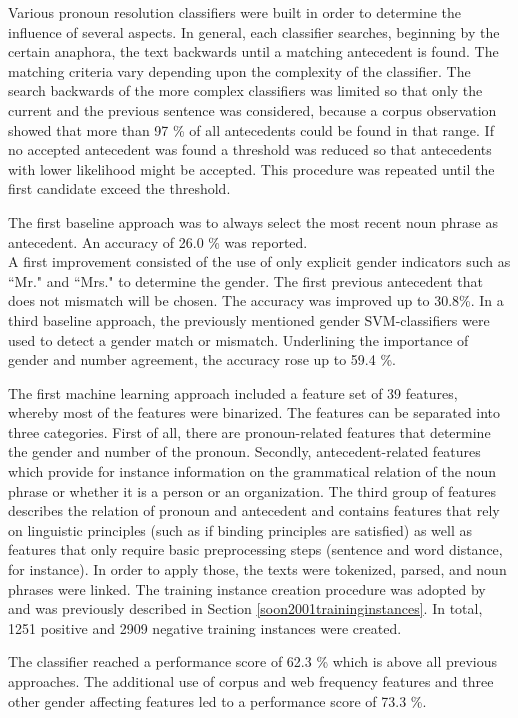 Various pronoun resolution classifiers were built in order to determine the influence of several aspects. In general, each classifier searches, beginning by the certain anaphora, the text backwards until a matching antecedent is found. The matching criteria vary depending upon the complexity of the classifier. The search backwards of the more complex classifiers was limited so that only the current and the previous sentence was considered, because a corpus observation showed that more than 97 \% of all antecedents could be found in that range. If no accepted antecedent was found a threshold was reduced so that antecedents with lower likelihood might be accepted. This procedure was repeated until the first candidate exceed the threshold. 

The first baseline approach was to always select the most recent noun phrase as antecedent. An accuracy of 26.0 \% was reported. \\
A first improvement consisted of the use of only explicit gender indicators such as “Mr." and “Mrs." to determine the gender. The first previous antecedent that does not mismatch will be chosen. The accuracy was improved up to 30.8\%. 
In a third baseline approach, the previously mentioned gender SVM-classifiers were used to detect a gender match or mismatch. Underlining the importance of gender and number agreement, the accuracy rose up to 59.4 \%.

The first machine learning approach included a feature set of 39 features, whereby most of the features were binarized. The features can be separated into three categories. First of all, there are pronoun-related features that determine the gender and number of the pronoun. Secondly, antecedent-related features which provide for instance information on the grammatical relation of the noun phrase or whether it is a person or an organization. The third group of features describes the relation of pronoun and antecedent and contains features that rely on linguistic principles (such as if binding principles are satisfied) as well as features that only require basic preprocessing steps (sentence and word distance, for instance). In order to apply those, the texts were tokenized, parsed, and noun phrases were linked. The training instance creation procedure was adopted by \cite{soon2001machine} and was previously described in Section \ref{soon2001traininginstances}. In total, 1251 positive and 2909 negative training instances were created. 

The classifier reached a performance score of 62.3 \% which is above all previous approaches. The additional use of corpus and web frequency features and three other gender affecting features led to a performance score of 73.3 \%. 


